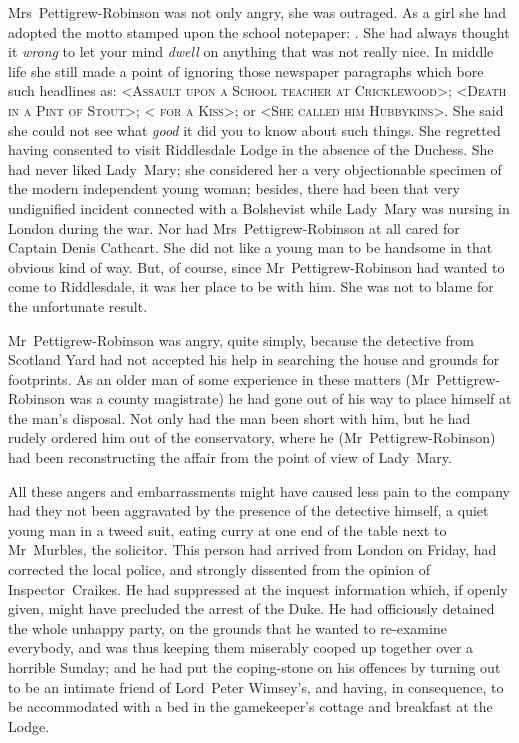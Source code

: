 Mrs~Pettigrew-Robinson was not only angry, she was outraged. As a girl she had adopted the motto stamped upon the school notepaper: . She had always thought it \emph{wrong} to let your mind \emph{dwell} on anything that was not really nice. In middle life she still made a point of ignoring those newspaper paragraphs which bore such headlines as: <\textsc{Assault upon a School teacher at Cricklewood}>; <\textsc{Death in a Pint of Stout}>; <\textsc{ for a Kiss}>; or <\textsc{She called him Hubbykins}>. She said she could not see what \emph{good} it did you to know about such things. She regretted having consented to visit Riddlesdale Lodge in the absence of the Duchess. She had never liked Lady~Mary; she considered her a very objectionable specimen of the modern independent young woman; besides, there had been that very undignified incident connected with a Bolshevist while Lady~Mary was nursing in London during the war. Nor had Mrs~Pettigrew-Robinson at all cared for Captain Denis Cathcart. She did not like a young man to be handsome in that obvious kind of way. But, of course, since Mr~Pettigrew-Robinson had wanted to come to Riddlesdale, it was her place to be with him. She was not to blame for the unfortunate result.

Mr~Pettigrew-Robinson was angry, quite simply, because the detective from Scotland Yard had not accepted his help in searching the house and grounds for footprints. As an older man of some experience in these matters (Mr~Pettigrew-Robinson was a county magistrate) he had gone out of his way to place himself at the man's disposal. Not only had the man been short with him, but he had rudely ordered him out of the conservatory, where he (Mr~Pettigrew-Robinson) had been reconstructing the affair from the point of view of Lady~Mary.

All these angers and embarrassments might have caused less pain to the company had they not been aggravated by the presence of the detective himself, a quiet young man in a tweed suit, eating curry at one end of the table next to Mr~Murbles, the solicitor. This person had arrived from London on Friday, had corrected the local police, and strongly dissented from the opinion of Inspector~Craikes. He had suppressed at the inquest information which, if openly given, might have precluded the arrest of the Duke. He had officiously detained the whole unhappy party, on the grounds that he wanted to re-examine everybody, and was thus keeping them miserably cooped up together over a horrible Sunday; and he had put the coping-stone on his offences by turning out to be an intimate friend of Lord~Peter Wimsey's, and having, in consequence, to be accommodated with a bed in the gamekeeper's cottage and breakfast at the Lodge.

